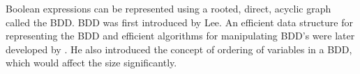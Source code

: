 Boolean expressions can be represented using a rooted, direct, acyclic graph called the BDD. BDD was first introduced by Lee\cite{Lee,1959}. An efficient data structure for representing the BDD and efficient algorithms for manipulating BDD's were later developed by \cite{Bryant 1986}. He also introduced the concept of ordering of variables in a BDD, which would affect the size significantly. 